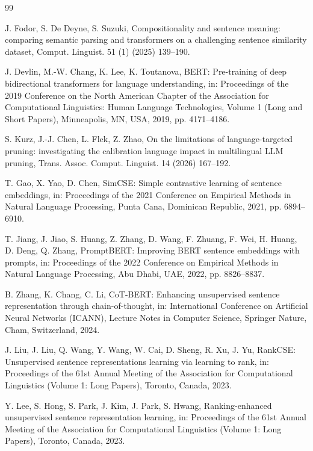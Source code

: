\documentclass[a4paper,fleqn]{cas-dc}
\begin{document}
\begin{thebibliography}{99}

J. Fodor, S. De Deyne, S. Suzuki, Compositionality and sentence meaning: comparing semantic parsing and transformers on a challenging sentence similarity dataset, Comput. Linguist. 51 (1) (2025) 139--190.

J. Devlin, M.-W. Chang, K. Lee, K. Toutanova, BERT: Pre-training of deep bidirectional transformers for language understanding, in: Proceedings of the 2019 Conference on the North American Chapter of the Association for Computational Linguistics: Human Language Technologies, Volume 1 (Long and Short Papers), Minneapolis, MN, USA, 2019, pp. 4171--4186.

S. Kurz, J.-J. Chen, L. Flek, Z. Zhao, On the limitations of language-targeted pruning: investigating the calibration language impact in multilingual LLM pruning, Trans. Assoc. Comput. Linguist. 14 (2026) 167--192.

T. Gao, X. Yao, D. Chen, SimCSE: Simple contrastive learning of sentence embeddings, in: Proceedings of the 2021 Conference on Empirical Methods in Natural Language Processing, Punta Cana, Dominican Republic, 2021, pp. 6894--6910.

T. Jiang, J. Jiao, S. Huang, Z. Zhang, D. Wang, F. Zhuang, F. Wei, H. Huang, D. Deng, Q. Zhang, PromptBERT: Improving BERT sentence embeddings with prompts, in: Proceedings of the 2022 Conference on Empirical Methods in Natural Language Processing, Abu Dhabi, UAE, 2022, pp. 8826--8837.

B. Zhang, K. Chang, C. Li, CoT-BERT: Enhancing unsupervised sentence representation through chain-of-thought, in: International Conference on Artificial Neural Networks (ICANN), Lecture Notes in Computer Science, Springer Nature, Cham, Switzerland, 2024.

J. Liu, J. Liu, Q. Wang, Y. Wang, W. Cai, D. Sheng, R. Xu, J. Yu, RankCSE: Unsupervised sentence representations learning via learning to rank, in: Proceedings of the 61st Annual Meeting of the Association for Computational Linguistics (Volume 1: Long Papers), Toronto, Canada, 2023.

Y. Lee, S. Hong, S. Park, J. Kim, J. Park, S. Hwang, Ranking-enhanced unsupervised sentence representation learning, in: Proceedings of the 61st Annual Meeting of the Association for Computational Linguistics (Volume 1: Long Papers), Toronto, Canada, 2023.


\end{thebibliography}
\end{document}
